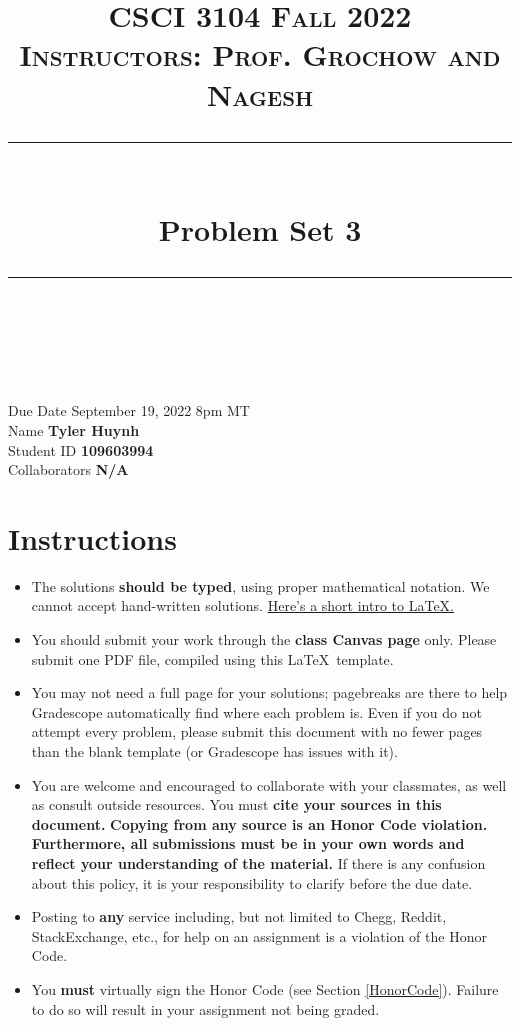 \documentclass[11pt]{article}
\title{
\normalfont \normalsize 
\textsc{CSCI 3104 Fall 2022 \\ 
Instructors: Prof. Grochow and Nagesh} \\
[10pt] 
\rule{\linewidth}{0.5pt} \\[6pt] 
\huge Problem Set 3 \\
\rule{\linewidth}{2pt}  \\[10pt]
}
\date{}
\theoremstyle{definition}
\theoremstyle{definition}
\theoremstyle{definition}
\begin{document}

\maketitle


\noindent
Due Date \dotfill September 19, 2022 8pm MT\\
Name \dotfill \textbf{Tyler Huynh} \\
Student ID \dotfill \textbf{109603994} \\
Collaborators \dotfill \textbf{N/A}

\tableofcontents

\section*{Instructions}

 \begin{itemize}
	\item The solutions \textbf{should be typed}, using proper mathematical notation. We cannot accept hand-written solutions. \href{http://ece.uprm.edu/~caceros/latex/introduction.pdf}{Here's a short intro to \LaTeX.}
	\item You should submit your work through the \textbf{class Canvas page} only. Please submit one PDF file, compiled using this \LaTeX \ template.
	\item You may not need a full page for your solutions; pagebreaks are there to help Gradescope automatically find where each problem is. Even if you do not attempt every problem, please submit this document with no fewer pages than the blank template (or Gradescope has issues with it).

	\item You are welcome and encouraged to collaborate with your classmates, as well as consult outside resources. You must \textbf{cite your sources in this document.} \textbf{Copying from any source is an Honor Code violation. Furthermore, all submissions must be in your own words and reflect your understanding of the material.} If there is any confusion about this policy, it is your responsibility to clarify before the due date. 

	\item Posting to \textbf{any} service including, but not limited to Chegg, Reddit, StackExchange, etc., for help on an assignment is a violation of the Honor Code.

	\item You \textbf{must} virtually sign the Honor Code (see Section \ref{HonorCode}). Failure to do so will result in your assignment not being graded.
\end{itemize}
\end{document}
